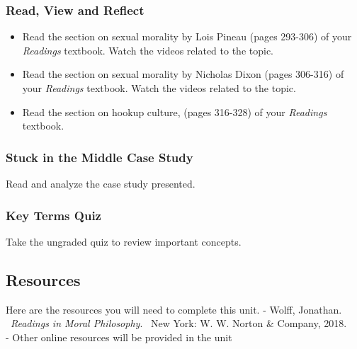 \documentclass[
]{book}
\begin{document}
\begin{reflect}
\hypertarget{read-view-and-reflect-17}{%
\subsubsection*{Read, View and Reflect}\label{read-view-and-reflect-17}}

\begin{itemize}
\item
  Read the section on sexual morality by Lois Pineau (pages 293-306) of your \emph{Readings} textbook. Watch the videos related to the topic.
\item
  Read the section on sexual morality by Nicholas Dixon (pages 306-316) of your \emph{Readings} textbook. Watch the videos related to the topic.
\item
  Read the section on hookup culture, (pages 316-328) of your \emph{Readings} textbook.
\end{itemize}

\hypertarget{stuck-in-the-middle-case-study}{%
\subsubsection*{Stuck in the Middle Case Study}\label{stuck-in-the-middle-case-study}}

Read and analyze the case study presented.

\hypertarget{key-terms-quiz-4}{%
\subsubsection*{Key Terms Quiz}\label{key-terms-quiz-4}}

Take the ungraded quiz to review important concepts.

\hypertarget{resources-5}{%
\subsection*{Resources}\label{resources-5}}

Here are the resources you will need to complete this unit.
- Wolff, Jonathan. ~\emph{Readings in Moral Philosophy}. ~New York: W. W. Norton \& Company, 2018.\\
- Other online resources will be provided in the unit
\end{reflect}
\end{document}
